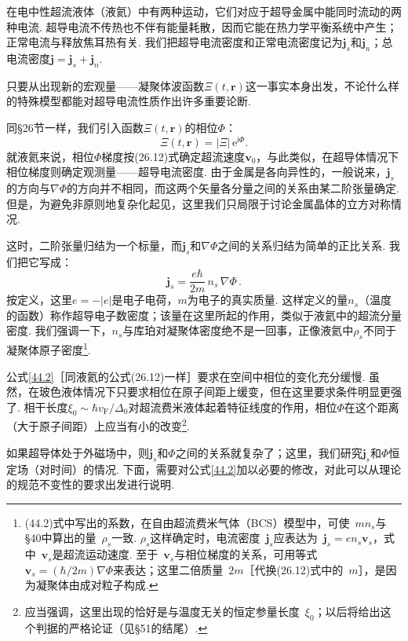 在电中性超流液体（液氦）中有两种运动，它们对应于超导金属中能同时流动的两种电流. 超导电流不传热也不伴有能量耗散，因而它能在热力学平衡系统中产生；正常电流与释放焦耳热有关. 我们把超导电流密度和正常电流密度记为$\bm j_s$和$\bm j_n$；总电流密度$\bm j=\bm j_s+\bm j_n$.

只要从出现新的宏观量——凝聚体波函数$\Xi(t,\bm r)$这一事实本身出发，不论什么样的特殊模型都能对超导电流性质作出许多重要论断.

同§26节一样，我们引入函数$\Xi(t,\bm r)$的相位$\Phi$：
\begin{equation}
\Xi(t,\bm r) = |\Xi|\,\mathrm e^{\mathrm i\Phi}.
\label{44.1}
\end{equation}
就液氦来说，相位$\Phi$梯度按(26.12)式确定超流速度$\bm v_0$，与此类似，在超导体情况下相位梯度则确定观测量——超导电流密度. 由于金属是各向异性的，一般说来，$\bm j_s$的方向与$\nabla\Phi$的方向并不相同，而这两个矢量各分量之间的关系由某二阶张量确定. 但是，为避免非原则地复杂化起见，这里我们只局限于讨论金属晶体的立方对称情况.

这时，二阶张量归结为一个标量，而$\bm j_s$和$\nabla\Phi$之间的关系归结为简单的正比关系. 我们把它写成：
\begin{equation}
\bm j_s = \frac{e\hbar}{2m}\,n_s\,\nabla\Phi\,.
\label{44.2}
\end{equation}
按定义，这里$e=-|e|$是电子电荷，$m$为电子的真实质量. 这样定义的量$n_s$（温度的函数）称作超导电子数密度；该量在这里所起的作用，类似于液氦中的超流分量密度. 我们强调一下，$n_s$与库珀对凝聚体密度绝不是一回事，正像液氦中$\rho_s$不同于凝聚体原子密度\footnote{(44.2)式中写出的系数，在自由超流费米气体（BCS）模型中，可使~$mn_s$与§40中算出的量~$\rho_s$一致. $\rho_s$这样确定时，电流密度~$\bm j_s$应表达为~$\bm j_s=en_s\bm v_s$，式中~$\bm v_s$是超流运动速度. 至于~$\bm v_s$与相位梯度的关系，可用等式~$\bm v_s=(\hbar/2m)\nabla\Phi$来表达；这里二倍质量~$2m$［代换(26.12)式中的~$m$］，是因为凝聚体由成对粒子构成.}.

公式\eqref{44.2}［同液氦的公式(26.12)一样］要求在空间中相位的变化充分缓慢. 虽然，在玻色液体情况下只要求相位在原子间距上缓变，但在这里要求条件明显更强了. 相干长度$\xi_0\sim\hbar v_{\mathrm F}/\Delta_0$对超流费米液体起着特征线度的作用，相位$\Phi$在这个距离（大于原子间距）上应当有小的改变\footnote{应当强调，这里出现的恰好是与温度无关的恒定参量长度~$\xi_0$；以后将给出这个判据的严格论证（见§51的结尾）.}.

如果超导体处于外磁场中，则$\bm j_s$和$\Phi$之间的关系就复杂了；这里，我们研究$\bm j_s$和$\Phi$恒定场（对时间）的情况. 下面，需要对公式\eqref{44.2}加以必要的修改，对此可以从理论的规范不变性的要求出发进行说明.

